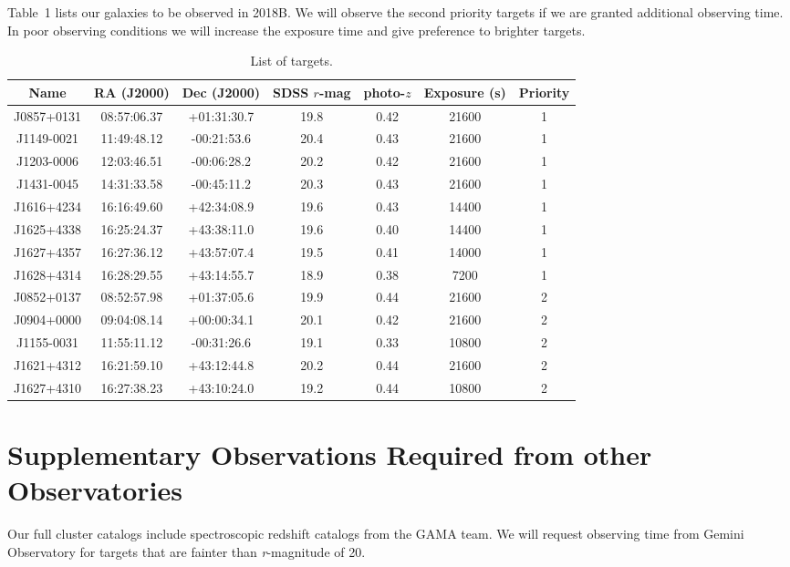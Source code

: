 \documentclass[letterpaper,12pt]{article}
\begin{document}
Table~1 lists our galaxies to be observed in 2018B. We will observe the second priority targets if we are granted 
additional observing time. In poor observing conditions we will increase the exposure time and give preference to 
brighter targets. 

\begin{table}
\caption{List of targets.}
\begin{tabular}{ccccccc}
\hline
Name & RA (J2000) & Dec (J2000) & SDSS $r$-mag & photo-$z$ & Exposure (s) & Priority \\
\hline
J0857+0131 & 08:57:06.37 & +01:31:30.7 & 19.8 & 0.42 & 21600 & 1 \\
J1149-0021 & 11:49:48.12 & -00:21:53.6 & 20.4 & 0.43 & 21600 & 1 \\
J1203-0006 & 12:03:46.51 & -00:06:28.2 & 20.2 & 0.42 & 21600 & 1 \\
J1431-0045 & 14:31:33.58 & -00:45:11.2 & 20.3 & 0.43 & 21600 & 1 \\
J1616+4234 & 16:16:49.60 & +42:34:08.9 & 19.6 & 0.43 & 14400 & 1 \\
J1625+4338 & 16:25:24.37 & +43:38:11.0 & 19.6 & 0.40 & 14400 & 1 \\
J1627+4357 & 16:27:36.12 & +43:57:07.4 & 19.5 & 0.41 & 14000 & 1 \\
J1628+4314 & 16:28:29.55 & +43:14:55.7 & 18.9 & 0.38 & 7200 & 1 \\
J0852+0137 & 08:52:57.98 & +01:37:05.6 & 19.9 & 0.44 & 21600 & 2 \\
J0904+0000 & 09:04:08.14 & +00:00:34.1 & 20.1 & 0.42 & 21600 & 2 \\
J1155-0031 & 11:55:11.12 & -00:31:26.6 & 19.1 & 0.33 & 10800 & 2 \\
J1621+4312 & 16:21:59.10 & +43:12:44.8 & 20.2 & 0.44 & 21600 & 2 \\
J1627+4310 & 16:27:38.23 & +43:10:24.0 & 19.2 & 0.44 & 10800 & 2 \\

\end{tabular}
\end{table}

\section{Supplementary Observations Required from other Observatories}

Our full cluster catalogs include spectroscopic redshift catalogs from the GAMA team. We will 
request observing time from Gemini Observatory for targets that are fainter than 
{\it r}-magnitude of 20. 
\end{document}
